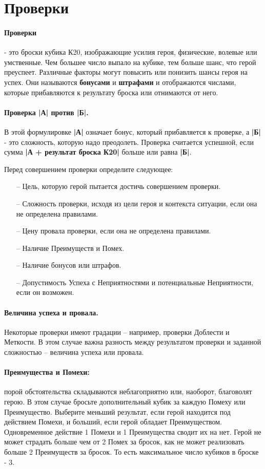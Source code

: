 \section{Проверки}
\paragraph{Проверки} - это броски кубика К20, изображающие усилия героя, физические, волевые или умственные. Чем большее число выпало на кубике, тем больше шанс, что герой преуспеет. Различные факторы могут повысить или понизить шансы героя на успех. Они называются \textbf{бонусами} и \textbf{штрафами} и отображаются числами, которые прибавляются к результату броска или отнимаются от него.
\paragraph{Проверка |А| против |Б|.} В этой формулировке \textbf{|А|} означает бонус, который прибавляется к проверке, а \textbf{|Б|} - это сложность, которую надо преодолеть. Проверка считается успешной, если сумма \textbf{|А + результат броска К20|} больше или равна \textbf{|Б|}.

Перед совершением проверки определите следующее:
\begin{itemize}
\item[--]Цель, которую герой пытается достичь совершением проверки.
\item[--]Сложность проверки, исходя из цели героя и контекста
ситуации, если она не определена правилами.
\item[--]Цену провала проверки, если она не определена правилами.
\item[--]Наличие Преимуществ и Помех.
\item[--]Наличие бонусов или штрафов.
\item[--]Допустимость Успеха с Неприятностями и потенциальные Неприятности, если он возможен.
\end{itemize}


\paragraph{Величина успеха и провала.} Некоторые проверки имеют градации – например, проверки Доблести и Меткости. В этом случае важна разность между результатом проверки и заданной сложностью – величина успеха или провала.

\paragraph{Преимущества и Помехи:} порой обстоятельства складываются неблагоприятно или, наоборот, благоволят герою. В этом случае бросьте дополнительный кубик за каждую Помеху или Преимущество. Выберите меньший результат, если герой находится под действием Помехи, и больший, если герой обладает Преимуществом. Одновременное действие 1 Помехи и 1 Преимущества сводит их на нет. 
\newline Герой не может страдать больше чем от 2 Помех за бросок, как не может реализовать больше 2 Преимуществ за бросок. То есть максимальное число кубиков в броске - 3.
